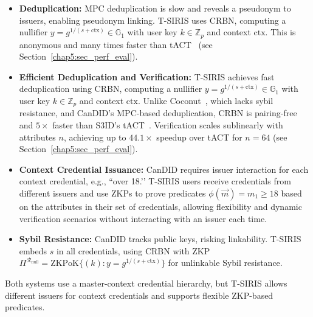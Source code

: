 \begin{itemize}
    \item \textbf{Deduplication:} MPC deduplication is slow and reveals a pseudonym to issuers, enabling pseudonym linking. T-SIRIS uses CRBN, computing a nullifier $y = g^{1/(s + \text{ctx})} \in \mathbb{G}_1$ with user key $k \in \mathbb{Z}_p$ and context $\text{ctx}$. This is anonymous and many times faster than tACT~\cite{rabaninejad_attribute-based_2024} (see Section~\ref{chap5:sec_perf_eval}).

    \item \textbf{Efficient Deduplication and Verification:} T-SIRIS achieves fast deduplication using CRBN, computing a nullifier $y = g^{1/(s + \text{ctx})} \in \mathbb{G}_1$ with user key $k \in \mathbb{Z}_p$ and context $\text{ctx}$. Unlike Coconut~\cite{sonnino_coconut_2020}, which lacks sybil resistance, and CanDID’s MPC-based deduplication, CRBN is pairing-free and $5\times$ faster than S3ID’s tACT~\cite{rabaninejad_attribute-based_2024}. Verification scales sublinearly with attributes $n$, achieving up to $44.1\times$ speedup over tACT for $n=64$ (see Section~\ref{chap5:sec_perf_eval}).
    
    \item \textbf{Context Credential Issuance:} CanDID requires issuer interaction for each context credential, e.g., ``over 18.’’ T-SIRIS users receive credentials from different issuers and use ZKPs to prove predicates $\phi(\vec{m}) = m_1 \geq 18$ based on the attributes in their set of credentials, allowing flexibility and dynamic verification scenarios without interacting with an issuer each time. 
    
    \item \textbf{Sybil Resistance:} CanDID tracks public keys, risking linkability. T-SIRIS embeds $s$ in all credentials, using CRBN with ZKP $\Pi^{\mathcal{R}_{\text{null}}} = \text{ZKPoK}\{(k): y = g^{1/(s + \text{ctx})}\}$ for unlinkable Sybil resistance.
\end{itemize}

Both systems use a master-context credential hierarchy, but T-SIRIS allows different issuers for context credentials and supports flexible ZKP-based predicates.

